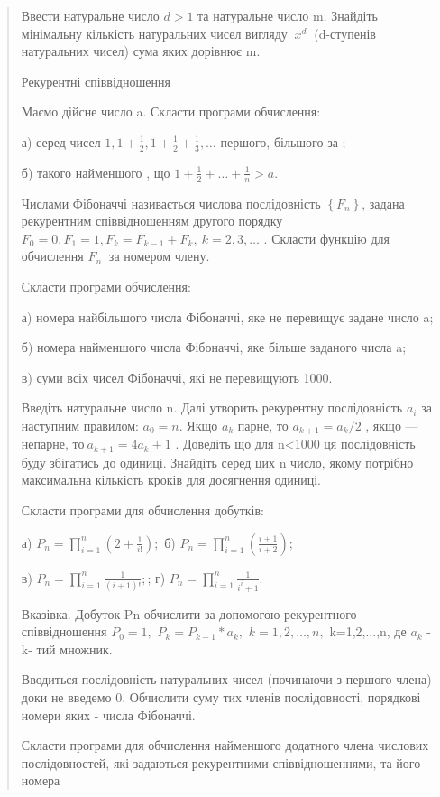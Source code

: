 \documentclass[]{article}
\begin{document}
\begin{quote}
Ввести натуральне число \(d > 1\) та натуральне число m. Знайдіть
мінімальну кількість натуральних чисел вигляду \(\ x^{d}\ \) (d-ступенів
натуральних чисел) сума яких дорівнює m.

Рекурентні співвідношення

Маємо дійсне число a. Скласти програми обчислення:

а) серед чисел
\(1,1 + \frac{1}{2},1 + \frac{1}{2} + \frac{1}{3},\ldots\) першого,
більшого за ;

б) такого найменшого , що
\(1 + \frac{1}{2} + \ldots + \frac{1}{n} > a.\)

Числами Фібоначчі називається числова послідовність
\(\left\{ F_{n} \right\}\), задана рекурентним співвідношенням другого
порядку
\(F_{0} = 0,F_{1} = 1,F_{k} = F_{k - 1} + F_{k},\ k = 2,3,\ldots\) .
Скласти функцію для обчислення \(F_{n}\ \) за номером члену.

Скласти програми обчислення:

а) номера найбільшого числа Фібоначчі, яке не перевищує задане число a;

б) номера найменшого числа Фібоначчі, яке більше заданого числа a;

в) суми всіх чисел Фібоначчі, які не перевищують 1000.

Введіть натуральне число n. Далі утворить рекурентну послідовність
\(a_{i}\) за наступним правилом: \(a_{0} = n\). Якщо \(a_{k}\) парне, то
\(a_{k + 1} = a_{k}/2\) , якщо --- непарне,
то\(\ a_{k + 1} = 4a_{k} + 1\) . Доведіть що для n\textless{}1000 ця
послідовність буду збігатись до одиниці. Знайдіть серед цих n число,
якому потрібно максимальна кількість кроків для досягнення одиниці.

Скласти програми для обчислення добутків:

а) \(P_{n} = \prod_{i = 1}^{n}\left( 2 + \frac{1}{i!} \right);\) б)
\(P_{n} = \prod_{i = 1}^{n}\left( \frac{i + 1}{i + 2} \right);\)

в) \(P_{n} = \prod_{i = 1}^{n}\frac{1}{(i + 1)!};\); г)
\(P_{n} = \prod_{i = 1}^{n}\frac{1}{i^{i} + 1}.\)

Вказівка. Добуток Pn обчислити за допомогою рекурентного співвідношення
\(P_{0} = 1,\) \(P_{k} = P_{k - 1}*a_{k},\) \(k = 1,2,\ldots,n,\)
k=1,2,...,n, де \(a_{k}\) - k- тий множник.

Вводиться послідовність натуральних чисел (починаючи з першого члена)
доки не введемо 0. Обчислити суму тих членів послідовності, порядкові
номери яких - числа Фібоначчі.

Скласти програми для обчислення найменшого додатного члена числових
послідовностей, які задаються рекурентними співвідношеннями, та його
номера


\end{quote}
\end{document}
